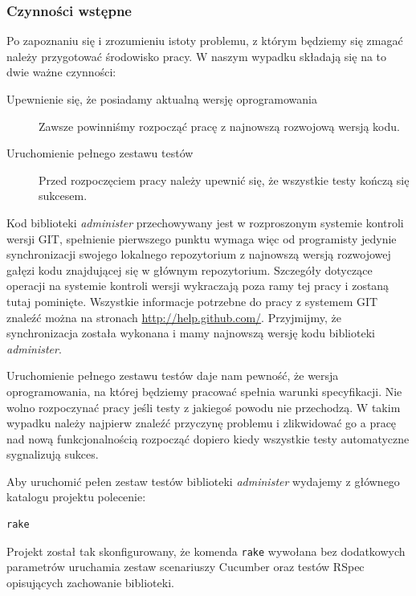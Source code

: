   	\subsubsection{Czynności wstępne}
  	
  	Po zapoznaniu się i zrozumieniu istoty problemu, z którym będziemy się zmagać należy przygotować środowisko pracy. W naszym wypadku składają się na to dwie ważne czynności:
  	
  	 \begin{description}
        \item[Upewnienie się, że posiadamy aktualną wersję oprogramowania] Zawsze powinniśmy rozpocząć pracę z najnowszą rozwojową wersją kodu.
        \item[Uruchomienie pełnego zestawu testów] Przed rozpoczęciem pracy należy upewnić się, że wszystkie testy kończą się sukcesem.
      \end{description}
      
    Kod biblioteki \emph{administer} przechowywany jest w rozproszonym systemie kontroli wersji GIT, spełnienie pierwszego punktu wymaga więc od programisty jedynie synchronizacji swojego lokalnego repozytorium z najnowszą wersją rozwojowej gałęzi kodu znajdującej się w głównym repozytorium. Szczegóły dotyczące operacji na systemie kontroli wersji wykraczają poza ramy tej pracy i zostaną tutaj pominięte. Wszystkie informacje potrzebne do pracy z systemem GIT znaleźć można na stronach \url{http://help.github.com/}. Przyjmijmy, że synchronizacja została wykonana i mamy najnowszą wersję kodu biblioteki \emph{administer}. 
    
    Uruchomienie pełnego zestawu testów daje nam pewność, że wersja oprogramowania, na której będziemy pracować spełnia warunki specyfikacji. Nie wolno rozpoczynać pracy jeśli testy z jakiegoś powodu nie przechodzą. W takim wypadku należy najpierw znaleźć przyczynę problemu i zlikwidować go a pracę nad nową funkcjonalnością rozpocząć dopiero kiedy wszystkie testy automatyczne sygnalizują sukces.
    
    Aby uruchomić pełen zestaw testów biblioteki \emph{administer} wydajemy z głównego katalogu projektu polecenie:
    
\begin{lstlisting}
rake
\end{lstlisting}
    
    Projekt został tak skonfigurowany, że komenda \texttt{rake} wywołana bez dodatkowych parametrów uruchamia zestaw scenariuszy Cucumber oraz testów RSpec opisujących zachowanie biblioteki. 
    
